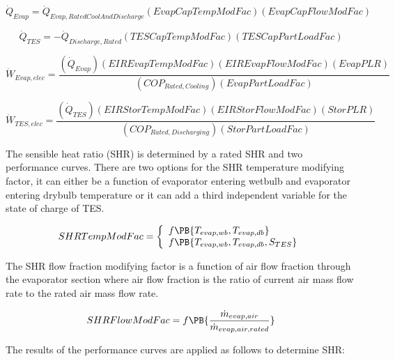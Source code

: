 \begin{equation}
{\dot Q_{Evap}} = {\dot Q_{Evap,RatedCoolAndDischarge}}\left( {EvapCapTempModFac} \right)\left( {EvapCapFlowModFac} \right)
\end{equation}

\begin{equation}
{\dot Q_{TES}} =  - {\dot Q_{Discharge,Rated}}\left( {TESCapTempModFac} \right)\left( {TESCapPartLoadFac} \right)
\end{equation}

\begin{equation}
{\dot W_{Evap,elec}} = \frac{{\left( {{{\dot Q}_{Evap}}} \right)\left( {EIREvapTempModFac} \right)\left( {EIREvapFlowModFac} \right)\left( {EvapPLR} \right)}}{{\left( {CO{P_{Rated,Cooling}}} \right)\left( {EvapPartLoadFac} \right)}}
\end{equation}

\begin{equation}
{\dot W_{TES,elec}} = \frac{{\left( {{{\dot Q}_{TES}}} \right)\left( {EIRStorTempModFac} \right)\left( {EIRStorFlowModFac} \right)\left( {StorPLR} \right)}}{{\left( {CO{P_{Rated,Discharging}}} \right)\left( {StorPartLoadFac} \right)}}
\end{equation}

The sensible heat ratio (SHR) is determined by a rated SHR and two performance curves. There are two options for the SHR temperature modifying factor, it can either be a function of evaporator entering wetbulb and evaporator entering drybulb temperature or it can add a third independent variable for the state of charge of TES.

\begin{equation}
  SHRTempModFac = \left\{
    \begin{array}{l}
      f\PB{T_{evap,wb},T_{evap,db}} \\
      f\PB{T_{evap,wb},T_{evap,db},S_{TES}}
    \end{array}
  \right.
\end{equation}

The SHR flow fraction modifying factor is a function of air flow fraction through the evaporator section where air flow fraction is the ratio of current air mass flow rate to the rated air mass flow rate.

\begin{equation}
SHRFlowModFac = f\PB{\frac{\dot{m}_{evap,air}}{\dot{m}_{evap,air,rated}}}
\end{equation}

The results of the performance curves are applied as follows to determine SHR:

